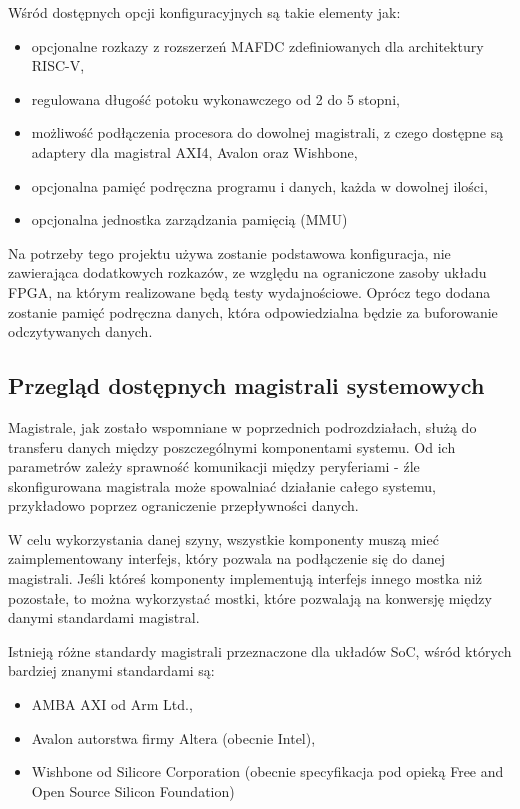 Wśród dostępnych opcji konfiguracyjnych są takie elementy jak:
\begin{itemize}
	\item opcjonalne rozkazy z rozszerzeń MAFDC zdefiniowanych dla architektury RISC-V,
	\item regulowana długość potoku wykonawczego od 2 do 5 stopni,
	\item możliwość podłączenia procesora do dowolnej magistrali, z czego dostępne są adaptery dla magistral AXI4, Avalon oraz Wishbone,
	\item opcjonalna pamięć podręczna programu i danych, każda w dowolnej ilości,
	\item opcjonalna jednostka zarządzania pamięcią (MMU)
\end{itemize}

Na potrzeby tego projektu używa zostanie podstawowa konfiguracja, nie zawierająca dodatkowych rozkazów, ze względu na ograniczone zasoby układu FPGA, na którym realizowane będą testy wydajnościowe. Oprócz tego dodana zostanie pamięć podręczna danych, która odpowiedzialna będzie za buforowanie odczytywanych danych.

\subsection{Przegląd dostępnych magistrali systemowych}

Magistrale, jak zostało wspomniane w poprzednich podrozdziałach, służą do transferu danych między poszczególnymi komponentami systemu. Od ich parametrów zależy sprawność komunikacji między peryferiami - źle skonfigurowana magistrala może spowalniać działanie całego systemu, przykładowo poprzez ograniczenie przepływności danych.

W celu wykorzystania danej szyny, wszystkie komponenty muszą mieć zaimplementowany interfejs, który pozwala na podłączenie się do danej magistrali. Jeśli któreś komponenty implementują interfejs innego mostka niż pozostałe, to można wykorzystać mostki, które pozwalają na konwersję między danymi standardami magistral.

Istnieją różne standardy magistrali przeznaczone dla układów SoC, wśród których bardziej znanymi standardami są:
\begin{itemize}
	\item AMBA AXI od Arm Ltd.,
	\item Avalon autorstwa firmy Altera (obecnie Intel),
	\item Wishbone od Silicore Corporation (obecnie specyfikacja pod opieką Free and Open Source Silicon Foundation)
\end{itemize}

